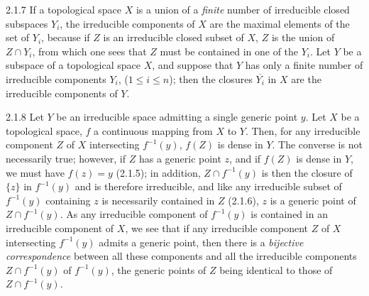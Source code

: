 \documentclass[../main.tex]{subfiles}
\begin{document}
\begin{cx}{2.1.7}
If a topological space $X$ is a union of a \emph{finite} number of irreducible closed subspaces $Y_i$, the
irreducible components of $X$ are the maximal elements of the set of $Y_i$, because if $Z$ is an irreducible
closed subset of $X$, $Z$ is the union of $Z\cap Y_i$, from which one sees that $Z$ must be contained in one
of the $Y_i$. Let $Y$ be a subspace of a topological space $X$, and suppose that $Y$ has only a finite number
of irreducible components $Y_i$, ($1\leq i\leq n$); then the closures $\overline{Y_i}$ in $X$ are the
irreducible components of $Y$.
\end{cx}

\begin{cx}{2.1.8}
Let $Y$ be an irreducible space admitting a single generic point $y$.
Let $X$ be a topological space, $f$ a continuous mapping from $X$ to $Y$. Then, for
any irreducible component $Z$ of $X$ intersecting $f^{-1}(y)$, $f(Z)$ is dense in $Y$. The
converse is not necessarily true; however, if $Z$ has a generic point $z$,
and if $f(Z)$ is dense in $Y$, we must have $f(z)=y$ (2.1.5); in addition, $Z\cap f^{-1}(y)$
is then the closure of $\{z\}$ in $f^{-1}(y)$ and is therefore irreducible, and like any
irreducible subset of $f^{-1}(y)$ containing $z$ is necessarily contained in $Z$ (2.1.6), $z$ is
a generic point of $Z\cap f^{-1}(y)$. As any irreducible component of $f^{-1}(y)$ is
contained in an irreducible component of $X$, we see that if any irreducible component
$Z$ of $X$ intersecting $f^{-1}(y)$ admits a generic point, then there is a \emph{bijective correspondence}
between all these components and all the irreducible components
$Z\cap f^{-1}(y)$ of $f^{-1}(y)$, the generic points of $Z$ being identical to those of
$Z\cap f^{-1}(y)$.
\end{cx}
\end{document}
